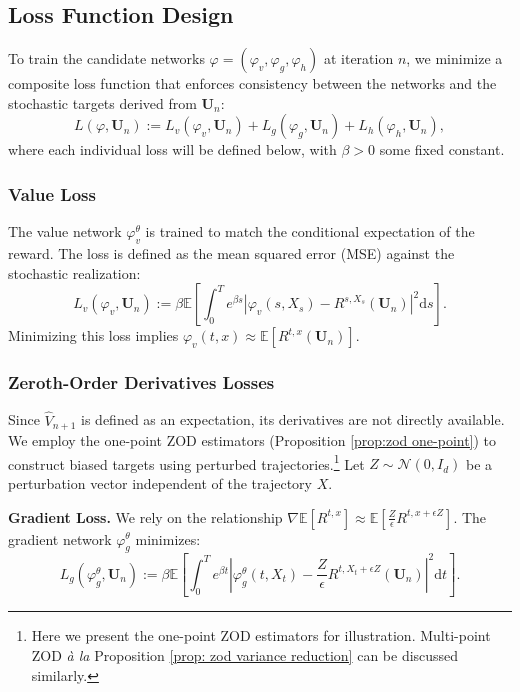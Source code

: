 \documentclass[twoside,11pt]{article}
\newcommand{\dd}{\mathrm{d}}
\newcommand{\E}{\mathbb{E}}
\newcommand{\1}{\mathbf{1}}
\numberwithin{equation}{section}
\begin{document}
\subsection{Loss Function Design}

To train the candidate networks $\varphi = (\varphi_v,\varphi_g,\varphi_h)$ at iteration $n$, we minimize a composite loss function that enforces consistency between the networks and the stochastic targets derived from $\mathbf{U}_n$:
\begin{equation}\label{eq:total_loss}
    L(\varphi, \mathbf{U}_n) := L_v(\varphi_v, \mathbf{U}_n) +  L_g(\varphi_g, \mathbf{U}_n) +   L_h(\varphi_h, \mathbf{U}_n),
\end{equation}
where each individual loss will be defined below, with $\beta>0$ some fixed constant.

\subsubsection{Value Loss}
The value network $\varphi^{\theta}_v$ is trained to match the conditional expectation of the reward. The loss is defined as the mean squared error (MSE) against the stochastic realization:
\begin{equation}
    L_v(\varphi_v, \mathbf{U}_n) := \beta \E\left[ \int_0^T e^{\beta s}\left| \varphi_v(s, X_s) - R^{s,X_s}(\mathbf{U}_n) \right|^2 \dd s \right].
\end{equation}
Minimizing this loss implies $\varphi_v(t,x) \approx \E[R^{t,x}(\mathbf{U}_n)]$.

\subsubsection{Zeroth-Order Derivatives Losses}
Since $\hat{V}_{n+1}$ is defined as an expectation, its derivatives are not directly available. We employ the one-point ZOD estimators (Proposition \ref{prop:zod one-point}) to construct biased targets using perturbed trajectories.\footnote{Here we present the one-point ZOD estimators for illustration. Multi-point ZOD {\it \`a la} Proposition \ref{prop: zod variance reduction} can be discussed similarly.} Let $Z \sim \mathcal{N}(0, I_d)$ be a perturbation vector independent of the trajectory $X$.

\textbf{Gradient Loss.} We rely on the relationship $\nabla \E[R^{t,x}] \approx \E[\frac{Z}{\epsilon} R^{t, x+\epsilon Z}]$. The gradient network $\varphi^{\theta}_g$ minimizes:
\begin{equation}
    L_g(\varphi^{\theta}_g, \mathbf{U}_n) :=\beta\E\left[\int_0^T e^{\beta t}\left| \varphi^{\theta}_g(t, X_t) - \frac{Z}{\epsilon} R^{t,X_t+\epsilon Z}(\mathbf{U}_n) \right|^2 \dd t\right].
\end{equation}
\end{document}
